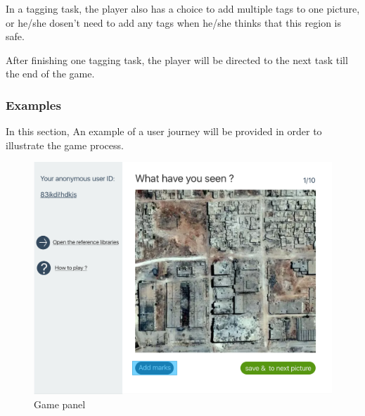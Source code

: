       In a tagging task,
      the player also has a choice to add multiple tags to one picture,
      or he/she dosen't need to add any tags when he/she thinks that this region is safe.

      After finishing one tagging task, 
      the player will be directed to the next task till the end of the game.


      \subsubsection{Examples}
      In this section,
      An example of a user journey will be provided in order to illustrate the game process.

      \noindent\begin{minipage}{.45\textwidth}
      \begin{figure}[H]
      \centering
      \includegraphics[width=\textwidth]{figures/function-player-0}
      \caption{Game panel}
      \label{fig:player0}
      \end{figure}
      \end{minipage}\hfill
